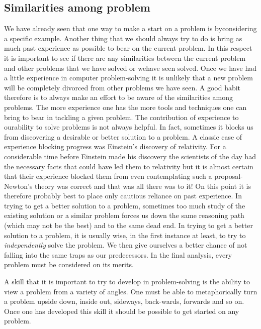 \documentclass{book}
\begin{document}
\subsection{Similarities among problem}
We have already seen that one way to make a start on a problem is byconsidering a specific example. Another thing that we should always try to do is bring as much past experience as possible to bear on the current problem. In this respect it is important to see if there are any similarities between the current problem and other problems that we have solved or wehave seen solved. Once we have had a little experience in computer problem-solving it is unlikely that a new problem will be completely divorced from other problems we have seen. A good habit therefore is to always make an effort to be aware of the similarities among problems. The more experience one has the more tools and techniques one can bring to bear in tackling a given problem. The contribution of experience to ourability to solve problems is not always helpful. In fact, sometimes it blocks us from discovering a desirable or better solution to a problem. A classic case of experience blocking progress was Einstein's discovery of relativity. For a considerable time before Einstein made his discovery the scientists of the day had the necessary facts that could have led them to relativity but it is almost certain that their experience blocked them from even contemplating such a proposal-Newton's theory was correct and that was all there was to it! On this point it is therefore probably best to place only cautious reliance on past experience. In trying to get a better solution to a problem, sometimes too much study of the existing solution or a similar problem forces us down the same reasoning path (which may not be the best) and to the same dead end. In trying to get a better solution to a problem, it is usually wise, in the first instance at least, to try to \textit{independently} solve the problem. We then give ourselves a better chance of not falling into the same traps as our predecessors. In the final analysis, every problem must be considered on its merits.\par
	A skill that it is important to try to develop in problem-solving is the ability to view a problem from a variety of angles. One must be able to metaphorically turn a problem upside down, inside out, sideways, back-wards, forwards and so on. Once one has developed this skill it should be possible to get started on any problem.
\end{document}

